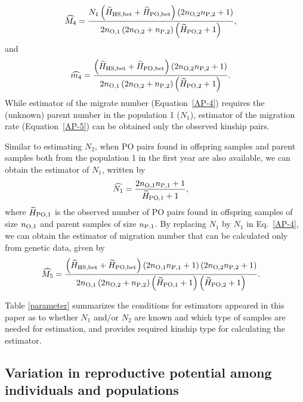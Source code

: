 \documentclass[12pt, English]{article}
\begin{document}
\begin{spacing}{1.9}
\begin{align}
\widehat{M_4} &=  \frac{ N_{1} \left(\widetilde{H}_{\rm HS,bet} + \widetilde{H}_{\rm PO,bet}\right) \left(2 n_{\rm O, 2} n_{\rm P, 2} + 1\right)} {2n_{\rm O, 1} \left(2 n_{\rm O, 2} + n_{\rm P, 2}\right) \left(\widetilde{H}_{\rm PO, 2} + 1\right)},
\label{AP-4}
\end{align}
and
\begin{align}
\widehat{m_4} &=  \frac{ \left(\widetilde{H}_{\rm HS,bet} + \widetilde{H}_{\rm PO,bet}\right) \left(2 n_{\rm O, 2} n_{\rm P, 2} + 1\right)} {2n_{\rm O, 1} \left(2 n_{\rm O, 2} + n_{\rm P, 2}\right) \left(\widetilde{H}_{\rm PO, 2} + 1\right)}.
\label{AP-5}
\end{align}
While estimator of the migrate number (Equation~\ref{AP-4}) requires the (unknown) parent number in the population 1 ($N_{1}$), estimator of the migration rate (Equation~\ref{AP-5}) can be obtained only the observed kinship pairs. 

Similar to estimating $N_2$, when PO pairs found in offspring samples and parent samples both from the population 1 in the first year are also available, we can obtain the estimator of $N_1$, written by
\begin{align}
\widehat{N_1} &= \frac{ 2 n_{\rm O, 1} n_{\rm P, 1} + 1 }{\widetilde{H}_{\rm PO, 1} + 1},
\label{AP-6}
\end{align}
where $\widetilde{H}_{\rm PO, 1}$ is the observed number of PO pairs found in offspring samples of size $n_{\rm O, 1}$ and parent samples of size $n_{\rm P, 1}$. By replacing $N_1$ by $\widehat{N_1}$ in Eq.~\ref{AP-4}, we can obtain the estimator of migration number that can be calculated only from genetic data, given by
\begin{align}
\widehat{M_5} &=  \frac{ \left(\widetilde{H}_{\rm HS,bet} + \widetilde{H}_{\rm PO,bet}\right) \left(2 n_{\rm O, 1} n_{\rm P, 1} + 1\right) \left(2 n_{\rm O, 2} n_{\rm P, 2} + 1\right)} {2n_{\rm O, 1} \left(2 n_{\rm O, 2} + n_{\rm P, 2}\right) \left(\widetilde{H}_{\rm PO, 1} + 1\right) \left(\widetilde{H}_{\rm PO, 2} + 1\right)}.
\label{AP-7}
\end{align}

Table \ref{parameter} summarizes the conditions for estimators appeared in this paper as to whether $N_1$ and/or $N_2$ are known and which type of samples are needed for estimation, and provides required kinship type for calculating the estimator. 

\subsection{Variation in reproductive potential among individuals and populations}


\end{spacing}
\end{document}
